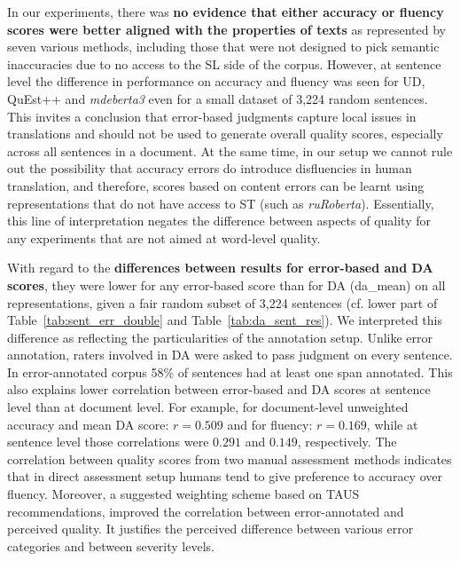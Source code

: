 In our experiments, there was \textbf{no evidence that either accuracy or fluency scores were better aligned with the properties of texts} as represented by seven various methods, including those that were not designed to pick semantic inaccuracies due to no access to the SL side of the corpus. However, at sentence level the difference in performance on accuracy and fluency was seen for UD, QuEst++ and \textit{mdeberta3} even for a small dataset of 3,224 random sentences. %
This invites a conclusion that error-based judgments capture local issues in translations and should not be used to generate overall quality scores, especially across all sentences in a document. At the same time, in our setup we cannot rule out the possibility that accuracy errors do introduce disfluencies in human translation, and therefore, scores based on content errors can be learnt using representations that do not have access to ST (such as \textit{ruRoberta}). Essentially, this line of interpretation negates the difference between aspects of quality for any experiments that are not aimed at word-level quality. 

With regard to the \textbf{differences between results for error-based and DA scores}, they were lower for any error-based score than for DA (da\_mean) on all representations, given a fair random subset of 3,224 sentences (cf. lower part of Table~\ref{tab:sent_err_double} and Table~\ref{tab:da_sent_res}). We interpreted this difference as reflecting the particularities of the annotation setup. Unlike error annotation, raters involved in DA were asked to pass judgment on every sentence. In error-annotated corpus 58\% of sentences had at least one span annotated. This also explains lower correlation between error-based and DA scores at sentence level than at document level. For example, for document-level unweighted accuracy and mean DA score: $r=0.509$ and for fluency: $r=0.169$, while at sentence level those correlations were $0.291$ and $0.149$, respectively.
The correlation between quality scores from two manual assessment methods indicates that in direct assessment setup humans tend to give preference to accuracy over fluency. %
Moreover, a suggested weighting scheme based on TAUS recommendations, improved the correlation between error-annotated and perceived quality. It justifies the perceived difference between various error categories and between severity levels. 

